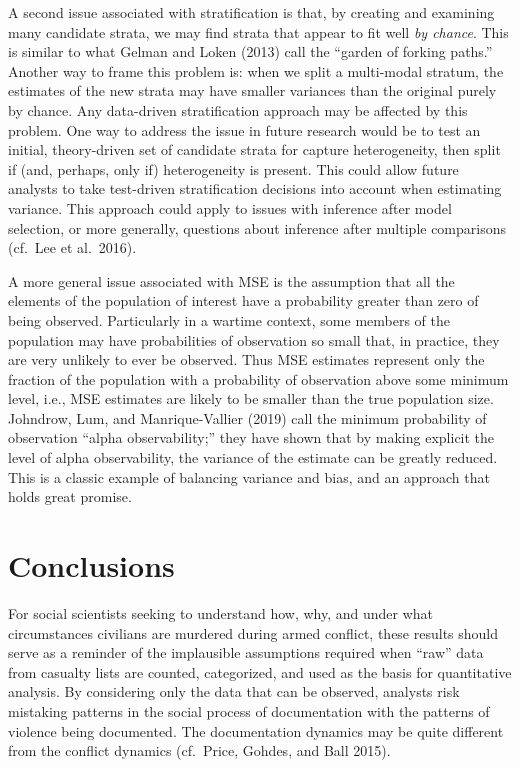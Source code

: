 \documentclass[11pt,]{article}
\begin{document}
A second issue associated with stratification is that, by creating and
examining many candidate strata, we may find strata that appear to fit
well \emph{by chance}. This is similar to what Gelman and Loken (2013)
call the ``garden of forking paths.'' Another way to frame this problem
is: when we split a multi-modal stratum, the estimates of the new strata
may have smaller variances than the original purely by chance. Any
data-driven stratification approach may be affected by this problem. One
way to address the issue in future research would be to test an initial,
theory-driven set of candidate strata for capture heterogeneity, then
split if (and, perhaps, only if) heterogeneity is present. This could
allow future analysts to take test-driven stratification decisions into
account when estimating variance. This approach could apply to issues
with inference after model selection, or more generally, questions about
inference after multiple comparisons (cf.~Lee et al.~2016).

A more general issue associated with MSE is the assumption that all the
elements of the population of interest have a probability greater than
zero of being observed. Particularly in a wartime context, some members
of the population may have probabilities of observation so small that,
in practice, they are very unlikely to ever be observed. Thus MSE
estimates represent only the fraction of the population with a
probability of observation above some minimum level, i.e., MSE estimates
are likely to be smaller than the true population size. Johndrow, Lum,
and Manrique-Vallier (2019) call the minimum probability of observation
``alpha observability;'' they have shown that by making explicit the
level of alpha observability, the variance of the estimate can be
greatly reduced. This is a classic example of balancing variance and
bias, and an approach that holds great promise.

\hypertarget{conclusions}{%
\section{Conclusions}\label{conclusions}}

For social scientists seeking to understand how, why, and under what
circumstances civilians are murdered during armed conflict, these
results should serve as a reminder of the implausible assumptions
required when ``raw'' data from casualty lists are counted, categorized,
and used as the basis for quantitative analysis. By considering only the
data that can be observed, analysts risk mistaking patterns in the
social process of documentation with the patterns of violence being
documented. The documentation dynamics may be quite different from the
conflict dynamics (cf.~Price, Gohdes, and Ball 2015).
\end{document}
